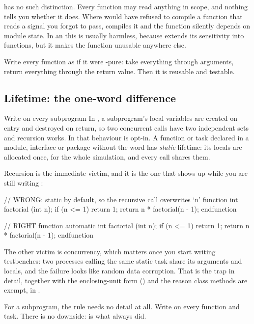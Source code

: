 \SV{} has no such distinction. Every function may read anything in scope, and
nothing tells you whether it does. Where \VHDL{} would have refused to compile
a function that reads a signal you forgot to pass, \SV{} compiles it and the
function silently depends on module state. In an  this is
usually harmless, because  extends its sensitivity into
functions, but it makes the function unusable anywhere else.

\begin{ruleofthumb}
Write every \SV{} function as if it were \VHDL{}-pure: take everything through
arguments, return everything through the return value. Then it is reusable and
testable.
\end{ruleofthumb}

\subsection{Lifetime: the one-word difference}

\begin{gotcha}{Write  on every subprogram}
In \VHDL{}, a subprogram's local variables are created on entry and destroyed
on return, so two concurrent calls have two independent sets and recursion
works. In \SV{} that behaviour is opt-in. A function or task declared in a
module, interface or package without the word  has \emph{static}
lifetime: its locals are allocated once, for the whole simulation, and every
call shares them.

Recursion is the immediate victim, and it is the one that shows up while you
are still writing \RTL{}:
\begin{svcode}
// WRONG: static by default, so the recursive call overwrites `n'
function int factorial (int n);
  if (n <= 1) return 1;
  return n * factorial(n - 1);
endfunction

// RIGHT
function automatic int factorial (int n);
  if (n <= 1) return 1;
  return n * factorial(n - 1);
endfunction
\end{svcode}
The other victim is concurrency, which matters once you start writing
testbenches: two processes calling the same static task share its arguments and
locals, and the failure looks like random data corruption. That is the trap in
detail, together with the enclosing-unit form
() and the reason class methods are exempt, in
.

For a subprogram, the rule needs no detail at all. Write  on
every function and task. There is no downside:  is what \VHDL{}
always did.
\end{gotcha}


